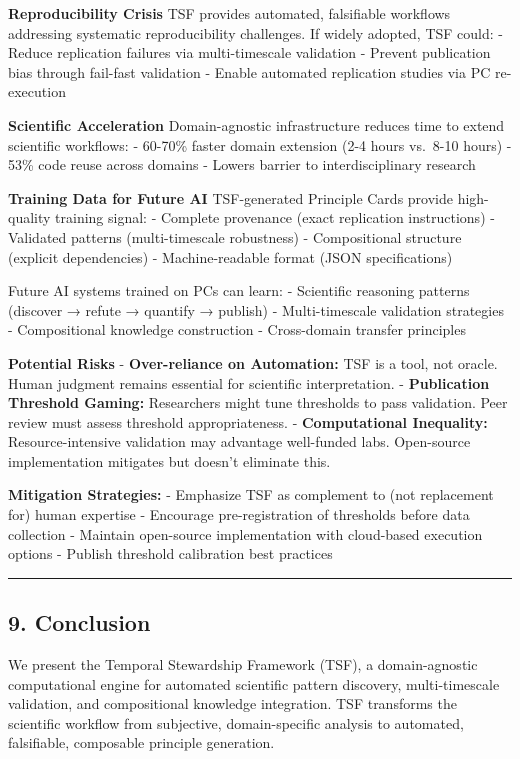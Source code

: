 \documentclass[
]{article}
\begin{document}
\textbf{Reproducibility Crisis} TSF provides automated, falsifiable
workflows addressing systematic reproducibility challenges. If widely
adopted, TSF could: - Reduce replication failures via multi-timescale
validation - Prevent publication bias through fail-fast validation -
Enable automated replication studies via PC re-execution

\textbf{Scientific Acceleration} Domain-agnostic infrastructure reduces
time to extend scientific workflows: - 60-70\% faster domain extension
(2-4 hours vs.~8-10 hours) - 53\% code reuse across domains - Lowers
barrier to interdisciplinary research

\textbf{Training Data for Future AI} TSF-generated Principle Cards
provide high-quality training signal: - Complete provenance (exact
replication instructions) - Validated patterns (multi-timescale
robustness) - Compositional structure (explicit dependencies) -
Machine-readable format (JSON specifications)

Future AI systems trained on PCs can learn: - Scientific reasoning
patterns (discover → refute → quantify → publish) - Multi-timescale
validation strategies - Compositional knowledge construction -
Cross-domain transfer principles

\textbf{Potential Risks} - \textbf{Over-reliance on Automation:} TSF is
a tool, not oracle. Human judgment remains essential for scientific
interpretation. - \textbf{Publication Threshold Gaming:} Researchers
might tune thresholds to pass validation. Peer review must assess
threshold appropriateness. - \textbf{Computational Inequality:}
Resource-intensive validation may advantage well-funded labs.
Open-source implementation mitigates but doesn't eliminate this.

\textbf{Mitigation Strategies:} - Emphasize TSF as complement to (not
replacement for) human expertise - Encourage pre-registration of
thresholds before data collection - Maintain open-source implementation
with cloud-based execution options - Publish threshold calibration best
practices

\begin{center}\rule{0.5\linewidth}{0.5pt}\end{center}

\subsection{9. Conclusion}\label{conclusion}

We present the Temporal Stewardship Framework (TSF), a domain-agnostic
computational engine for automated scientific pattern discovery,
multi-timescale validation, and compositional knowledge integration. TSF
transforms the scientific workflow from subjective, domain-specific
analysis to automated, falsifiable, composable principle generation.
\end{document}

